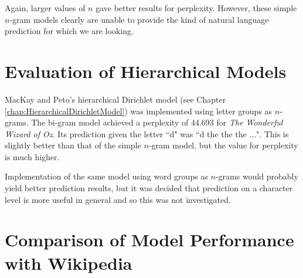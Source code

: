 Again, larger values of $n$ gave better results for perplexity. However, these simple $n$-gram models clearly are unable to provide the kind of natural language prediction for which we are looking.

\section{Evaluation of Hierarchical Models}

MacKay and Peto's hierarchical Dirichlet model (see Chapter \ref{chap:HierarchicalDirichletModel}) was implemented using letter groups as $n$-grams. The bi-gram model achieved a perplexity of 44.693 for \textit{The Wonderful Wizard of Oz}. Its prediction given the letter ``d" was ``d the the the ...". This is slightly better than that of the simple $n$-gram model, but the value for perplexity is much higher. 

Implementation of the same model using word groups as $n$-grams would probably yield better prediction results, but it was decided that prediction on a character level is more useful in general and so this was not investigated.



\section{Comparison of Model Performance with Wikipedia}

